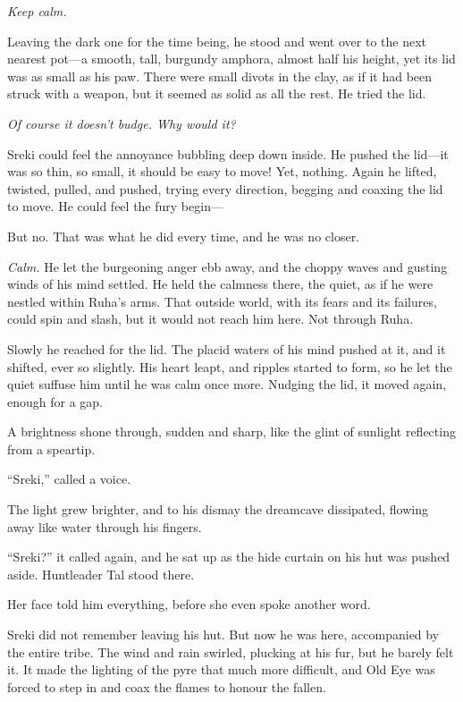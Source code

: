 \emph{Keep calm.}

Leaving the dark one for the time being, he stood and went over to the next nearest pot---a smooth, tall, burgundy amphora, almost half his height, yet its lid was as small as his paw. There were small divots in the clay, as if it had been struck with a weapon, but it seemed as solid as all the rest. He tried the lid.

\emph{Of course it doesn't budge. Why would it?}

Sreki could feel the annoyance bubbling deep down inside. He pushed the lid---it was so thin, so small, it should be easy to move! Yet, nothing. Again he lifted, twisted, pulled, and pushed, trying every direction, begging and coaxing the lid to move. He could feel the fury begin---

But no. That was what he did every time, and he was no closer.

\emph{Calm.} He let the burgeoning anger ebb away, and the choppy waves and gusting winds of his mind settled. He held the calmness there, the quiet, as if he were nestled within Ruha's arms. That outside world, with its fears and its failures, could spin and slash, but it would not reach him here. Not through Ruha.

Slowly he reached for the lid. The placid waters of his mind pushed at it, and it shifted, ever so slightly. His heart leapt, and ripples started to form, so he let the quiet suffuse him until he was calm once more. Nudging the lid, it moved again, enough for a gap.

A brightness shone through, sudden and sharp, like the glint of sunlight reflecting from a speartip.

``Sreki,'' called a voice.

The light grew brighter, and to his dismay the dreamcave dissipated, flowing away like water through his fingers.

``Sreki?'' it called again, and he sat up as the hide curtain on his hut was pushed aside. Huntleader Tal stood there.

Her face told him everything, before she even spoke another word.

\secdiv

\noindent Sreki did not remember leaving his hut. But now he was here, accompanied by the entire tribe. The wind and rain swirled, plucking at his fur, but he barely felt it. It made the lighting of the pyre that much more difficult, and Old Eye was forced to step in and coax the flames to honour the fallen.

